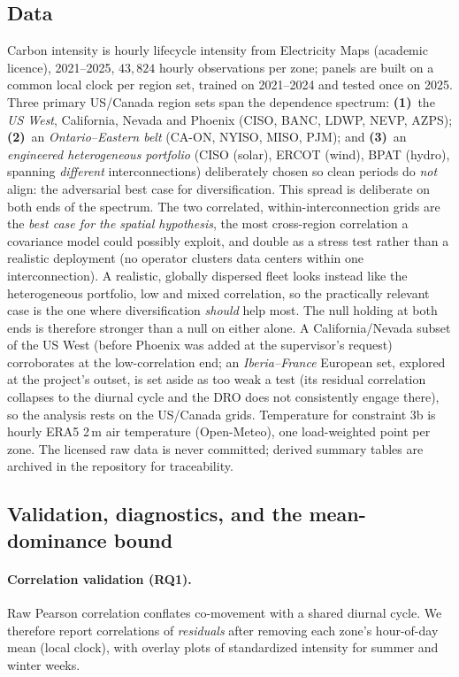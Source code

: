 \documentclass[12pt]{article}
\begin{document}
\subsection{Data}\label{sec:data}
Carbon intensity is hourly lifecycle intensity from Electricity Maps (academic
licence), 2021--2025, $43{,}824$ hourly observations per zone; panels are built on a
common local clock per region set, trained on 2021--2024 and tested once on 2025.
Three primary US/Canada region sets span the dependence spectrum:
\textbf{(1)}~the \emph{US West}, California, Nevada and Phoenix (CISO, BANC,
LDWP, NEVP, AZPS); \textbf{(2)}~an \emph{Ontario--Eastern belt} (CA-ON, NYISO,
MISO, PJM); and \textbf{(3)}~an \emph{engineered heterogeneous portfolio} (CISO
(solar), ERCOT (wind), BPAT (hydro), spanning \emph{different} interconnections)
deliberately chosen so clean periods do \emph{not} align: the adversarial best case
for diversification. This spread is deliberate on both ends of the spectrum. The two
correlated, within-interconnection grids are the \emph{best case for the spatial
hypothesis}, the most cross-region correlation a covariance model could possibly
exploit, and double as a stress test rather than a realistic deployment (no operator
clusters data centers within one interconnection). A realistic, globally dispersed
fleet looks instead like the heterogeneous portfolio, low and mixed correlation, so
the practically relevant case is the one where diversification \emph{should} help
most. The null holding at both ends is therefore stronger than a null on either alone.
A California/Nevada subset of the US West (before Phoenix was added at the supervisor's
request) corroborates at the low-correlation end; an \emph{Iberia--France} European set,
explored at the project's outset, is set aside as too weak a test (its residual
correlation collapses to the diurnal cycle and the DRO does not consistently engage
there), so the analysis rests on the US/Canada grids. Temperature for
constraint 3b is hourly ERA5 2\,m air temperature (Open-Meteo), one load-weighted
point per zone. The licensed raw data is never committed; derived summary tables
are archived in the repository for traceability.

\subsection{Validation, diagnostics, and the mean-dominance bound}\label{sec:diagnostics}
\paragraph{Correlation validation (RQ1).} Raw Pearson correlation conflates
co-movement with a shared diurnal cycle. We therefore report correlations of
\emph{residuals} after removing each zone's hour-of-day mean (local clock), with
overlay plots of standardized intensity for summer and winter weeks.
\end{document}
